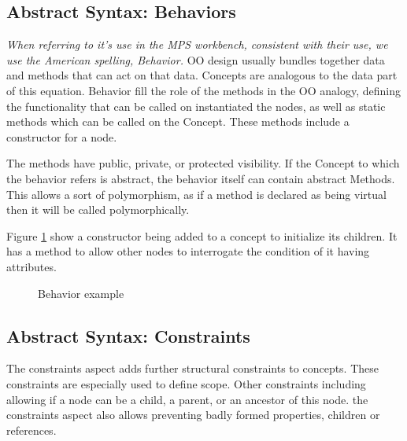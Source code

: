 \subsection{Abstract Syntax: Behaviors}
\emph{When referring to it's use in the MPS workbench, consistent with their use, we use the American spelling, Behavior.}
OO design usually bundles together data and methods that can act on that data.
Concepts are analogous to the data part of this equation.
Behavior fill the role of the methods in the OO analogy, defining the functionality that can be called on instantiated the nodes, as well as static methods which can be called on the Concept.
These methods include a constructor for a node.

The methods have public, private, or protected visibility.
If the Concept to which the behavior refers is abstract, the behavior itself can contain abstract Methods.
This allows a sort of polymorphism, as if a method is declared as being virtual then it will be called polymorphically.

Figure \ref{fig:behavior_example} show a constructor being added to a concept to initialize its children.
It has a method to allow other nodes to interrogate the condition of it having attributes.

\begin{figure}[h]
    \centering
    \caption{Behavior example}
    \label{fig:behavior_example}
\end{figure}
 

\subsection{Abstract Syntax: Constraints}
The constraints aspect adds further structural constraints to concepts.
These constraints are especially used to define scope.
Other constraints including allowing if a node can be a child, a parent, or an ancestor of this node.
the constraints aspect also allows preventing badly formed properties, children or references.

